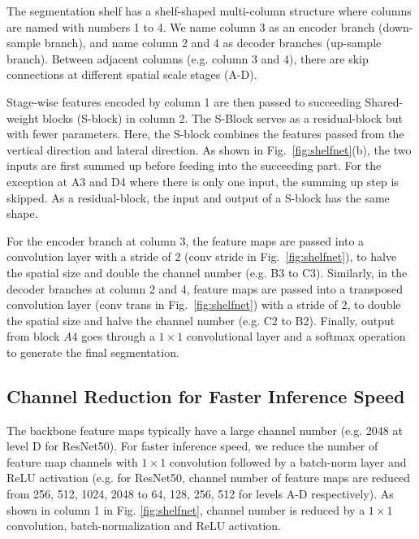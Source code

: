 \documentclass[10pt,twocolumn,letterpaper]{article}
\begin{document}
The segmentation shelf has a shelf-shaped multi-column structure where columns are named with numbers 1 to 4. We name column 3 as an encoder branch (down-sample branch), and name column 2 and 4 as decoder branches (up-sample branch). Between adjacent columns (e.g. column 3 and 4), there are skip connections at different spatial scale stages (A-D). 
  
Stage-wise features encoded by column 1 are then passed to succeeding Shared-weight blocks (S-block) in column 2. The S-Block serves as a residual-block but with fewer parameters. Here, the S-block combines the features passed from the vertical direction and lateral direction. As shown in Fig.~\ref{fig:shelfnet}(b), the two inputs are first summed up before feeding into the succeeding part. For the exception at A3 and D4 where there is only one input, the summing up step is skipped. As a residual-block, the input and output of a S-block has the same shape.
  
For the encoder branch at column 3, the feature maps are passed into a convolution layer with a stride of 2 (conv stride in Fig.~\ref{fig:shelfnet}), to halve the spatial size and double the channel number (e.g. B3 to C3). Similarly, in the decoder branches at column 2 and 4, feature maps are passed into a transposed convolution layer (conv trans in Fig.~\ref{fig:shelfnet}) with a stride of 2, to double the spatial size and halve the channel number (e.g. C2 to B2). Finally, output from block $A4$ goes through a $1\times1$ convolutional layer and a softmax operation to generate the final segmentation.

\subsection{Channel Reduction for Faster Inference Speed}
\label{sec:channel_reduction}
The backbone feature maps typically have a large channel number (e.g. 2048 at level D for ResNet50). For faster inference speed, we reduce the number of feature map channels with $1\times1$ convolution followed by a batch-norm layer and ReLU activation (e.g. for ResNet50, channel number of feature maps are reduced from 256, 512, 1024, 2048 to 64, 128, 256, 512 for levels A-D respectively). As shown in column 1 in Fig. \ref{fig:shelfnet}, channel number is reduced by a $1\times1$ convolution, batch-normalization and ReLU activation. 
\end{document}

